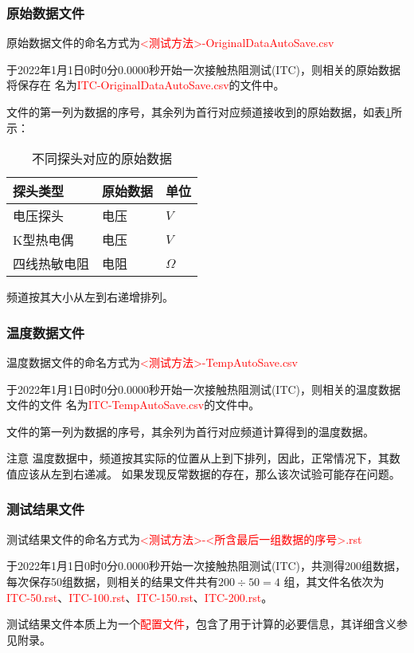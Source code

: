 \subsubsection*{原始数据文件}
原始数据文件的命名方式为\textcolor{red}{<测试方法>-OriginalDataAutoSave.csv}
\begin{example}
    于2022年1月1日0时0分0.0000秒开始一次接触热阻测试(ITC)，则相关的原始数据将保存在
    名为\textcolor{red}{ITC-OriginalDataAutoSave.csv}的文件中。
\end{example}
文件的第一列为数据的序号，其余列为首行对应频道接收到的原始数据，如表\ref{tab:originalData}所示：
\begin{table}[htbp]
    \centering
    \caption{ 不同探头对应的原始数据 \label{tab:originalData}}
    \begin{tabular}{@{}lll@{}}
        \toprule
        探头类型     & 原始数据 & 单位        \\ \midrule
        电压探头     & 电压     & $V $        \\
        K型热电偶    & 电压     & $V$         \\
        四线热敏电阻 & 电阻     & $\varOmega$ \\ \bottomrule
    \end{tabular}
\end{table}
频道按其大小从左到右递增排列。

\subsubsection*{温度数据文件}
温度数据文件的命名方式为\textcolor{red}{<测试方法>-TempAutoSave.csv}
\begin{example}
    于2022年1月1日0时0分0.0000秒开始一次接触热阻测试(ITC)，则相关的温度数据文件的文件
    名为\textcolor{red}{ITC-TempAutoSave.csv}的文件中。
\end{example}
文件的第一列为数据的序号，其余列为首行对应频道计算得到的温度数据。
\begin{tips}{注意}
    温度数据中，频道按其实际的位置从上到下排列，因此，正常情况下，其数值应该从左到右递减。
    如果发现反常数据的存在，那么该次试验可能存在问题。
\end{tips}

\subsubsection*{测试结果文件}
测试结果文件的命名方式为\textcolor{red}{<测试方法>-<所含最后一组数据的序号>.rst}
\begin{example}
    于2022年1月1日0时0分0.0000秒开始一次接触热阻测试(ITC)，共测得200组数据，每次保存50组数据，则相关的结果文件共有$200\div 50 = 4$
    组，其文件名依次为\textcolor{red}{ITC-50.rst}、\textcolor{red}{ITC-100.rst}、\textcolor{red}{ITC-150.rst}、\textcolor{red}{ITC-200.rst}。
\end{example}
测试结果文件本质上为一个\textcolor{red}{配置文件}，包含了用于计算的必要信息，其详细含义参见附录。

